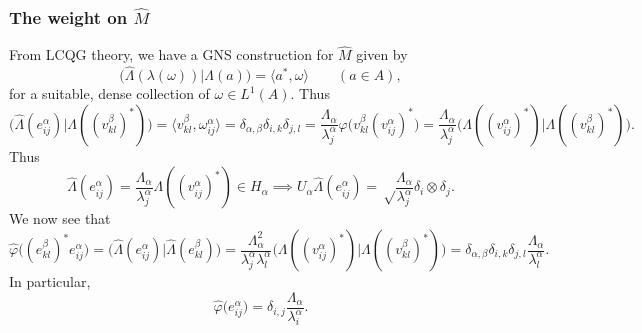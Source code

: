 \documentclass[twoside,a4paper,12pt]{article}
\theoremstyle{plain}
\theoremstyle{definition}
\newcommand{\ip}[2]{\langle #1,#2 \rangle}
\begin{document}
\subsubsection{The weight on $\hat M$}

From LCQG theory, we have a GNS construction for $\hat M$ given by
\[ \big( \hat\Lambda(\lambda(\omega)) \big| \Lambda(a) \big)
= \ip{a^*}{\omega} \qquad (a\in A), \]
for a suitable, dense collection of $\omega\in L^1(A)$.  Thus
\[ \big( \hat\Lambda(e^\alpha_{ij}) \big| \Lambda((v^\beta_{kl})^*) \big)
= \ip{v^\beta_{kl}}{\omega^\alpha_{ij}}
= \delta_{\alpha,\beta} \delta_{i,k} \delta_{j,l}
= \frac{\Lambda_\alpha}{\lambda^\alpha_j} \varphi\big( v^\beta_{kl}
(v^\alpha_{ij})^* \big)
= \frac{\Lambda_\alpha}{\lambda^\alpha_j}
\big( \Lambda( (v^\alpha_{ij})^* ) \big| \Lambda((v^\beta_{kl})^*) \big). \]
Thus
\[ \hat\Lambda(e^\alpha_{ij}) = \frac{\Lambda_\alpha}{\lambda^\alpha_j}
\Lambda( (v^\alpha_{ij})^*) \in H_\alpha
\implies
U_\alpha \hat\Lambda(e^\alpha_{ij}) =
\sqrt\frac{\Lambda_\alpha}{\lambda^\alpha_j} \delta_i \otimes \delta_j. \]
We now see that
\[ \hat\varphi\big( (e^\beta_{kl})^* e^\alpha_{ij} \big)
= \big( \hat\Lambda( e^\alpha_{ij} ) \big|
\hat\Lambda( e^\beta_{kl} ) \big)
= \frac{\Lambda_\alpha^2}{\lambda^\alpha_j\lambda^\alpha_l}
\big( \Lambda( (v^\alpha_{ij})^* ) \big|
\Lambda( (v^\beta_{kl})^* ) \big)
= \delta_{\alpha,\beta} \delta_{i,k} \delta_{j,l}
\frac{\Lambda_\alpha}{\lambda^\alpha_l}. \]
In particular,
\[ \hat\varphi\big( e^\alpha_{ij} \big) =
\delta_{i,j} \frac{\Lambda_\alpha}{\lambda^\alpha_i}. \]
\end{document}
